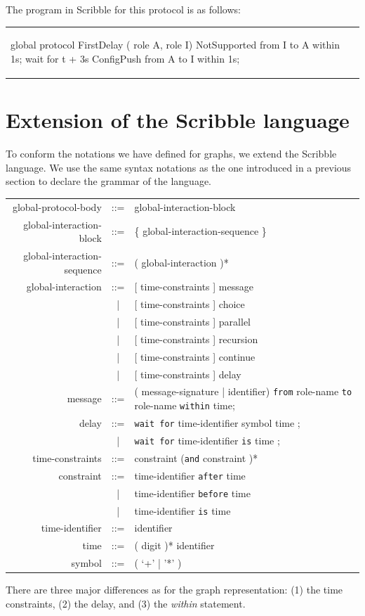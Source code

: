 \documentclass[a4paper,11pt,twoside]{report}
\begin{document}
The program in Scribble for this protocol is as follows:
\begin{center}
\begin{tabular}{ll}
\begin{SJLISTING}
global protocol FirstDelay ( role A, role I) {
	NotSupported from I to A within 1s;
	wait for t + 3s
	ConfigPush from A to I within 1s;
}
\end{SJLISTING}
& \\
\end{tabular}
\end{center}

\section{Extension of the Scribble language}
To conform the notations we have defined for graphs, we extend the Scribble language. We use the same syntax notations as the one introduced in a previous section to declare the grammar of the language. 
\begin{center}
\begin{tabular}{rcl}
global-protocol-body & ::= & global-interaction-block \\
global-interaction-block & ::= & \{ global-interaction-sequence \}  \\
global-interaction-sequence & ::= & ( global-interaction )*  \\
global-interaction & ::= & [ time-constraints ] message  \\
 & | & [ time-constraints ] choice  \\
 & | & [ time-constraints ] parallel \\
 & | & [ time-constraints ] recursion \\  
 & | & [ time-constraints ] continue  \\
 & | & [ time-constraints ] delay\\
message & ::= & ( message-signature | identifier)  \texttt{from} role-name  \texttt{to} role-name  \texttt{within} time;\\
delay & ::= &  \texttt{wait for} time-identifier symbol time ;\\
 & | &  \texttt{wait for} time-identifier \texttt{is} time ; \\
time-constraints & ::= &  constraint (\texttt{and} constraint )* \\
constraint & ::= &  time-identifier  \texttt{after} time   \\
 & | &  time-identifier \texttt{before} time \\
 & | &  time-identifier \texttt{is} time \\
time-identifier & ::= &  identifier \\
time & ::= &   ( digit  )* identifier \\
symbol &  ::= &  ( ‘+’ | ’*’ )\\
\end{tabular}
\end{center}
There are three major differences as for the graph representation: (1) the time constraints, (2) the delay, and (3) the \emph{within} statement.
\end{document}
